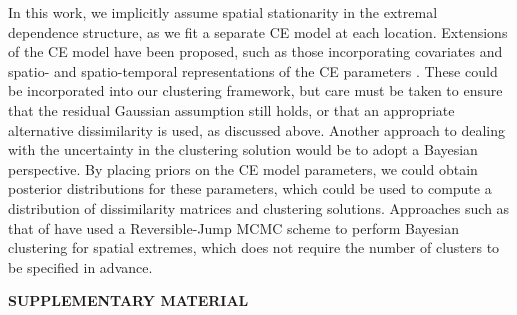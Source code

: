\documentclass[preprint,12pt,authoryear]{elsarticle}
\newcommand{\blind}{1}
\begin{document}
In this work, we implicitly assume spatial stationarity in the extremal dependence structure, as we fit a separate CE model at each location.
Extensions of the CE model have been proposed, such as those incorporating covariates \citep{Richards2023} and spatio- and spatio-temporal representations of the CE parameters \citep{Simpson2021, Wadsworth2022}.
These could be incorporated into our clustering framework, but care must be taken to ensure that the residual Gaussian assumption still holds, or that an appropriate alternative dissimilarity is used, as discussed above.
Another approach to dealing with the uncertainty in the clustering solution would be to adopt a Bayesian perspective.
By placing priors on the CE model parameters, we could obtain posterior distributions for these parameters, which could be used to compute a distribution of dissimilarity matrices and clustering solutions.
Approaches such as that of \citet{Rohrbeck2021} have used a Reversible-Jump MCMC scheme to perform Bayesian clustering for spatial extremes, which does not require the number of clusters to be specified in advance.



% 


\begin{center}
{\large\bf SUPPLEMENTARY MATERIAL}
\end{center}
\end{document}
